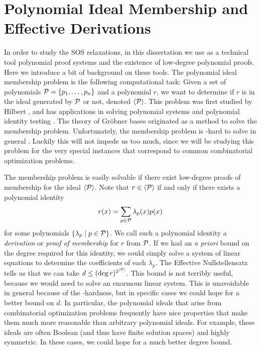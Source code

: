 \section{Polynomial Ideal Membership and Effective Derivations}

In order to study the SOS relaxations, in this dissertation we use as a technical tool polynomial proof systems and the existence of low-degree polynomial proofs.
Here we introduce a bit of background on these tools.
The polynomial ideal membership problem is the following computational task:
Given a set of polynomials $\mathcal P = \{p_1,\dots,p_n\}$ and a polynomial $r$, we want to determine if $r$ is in the ideal generated by $\mathcal P$ or not, denoted $\langle \mathcal P \rangle$.
This problem was first studied by Hilbert \cite{Hilbert1893}, and has applications in solving polynomial systems \cite{CLO07} and polynomial identity testing \cite{AM10}. 
The theory of Gr\"obner bases \cite{Buch65} originated as a method to solve the membership problem. 
Unfortunately, the membership problem is \expspace-hard to solve in general \cite{MM82,Huynh1985}.
Luckily this will not impede us too much, since we will be studying this problem for the very special instances that correspond to common combinatorial optimization problems.

The membership problem is easily solvable if there exist low-degree proofs of membership for the ideal $\langle \mathcal P \rangle$. 
Note that $r \in \langle \mathcal P \rangle$ if and only if there exists a polynomial identity
\[r(x) = \sum_{p \in \mathcal P} \lambda_p(x) p(x)\]
for some polynomials $\{\lambda_p \mid p \in \mathcal P\}$. We call such a polynomial identity a \emph{derivation} or \emph{proof of membership} for $r$ from $\mathcal P$.
If we had an \emph{a priori} bound on the degree required for this identity, we could simply solve a system of linear equations to determine the coefficients of each $\lambda_p$. The Effective Nullstellensatz \cite{Hermann1926} tells us that we can take $d \leq (\deg r)^{2^{|\mathcal P|}}$. This bound is not terribly useful, because we would need to solve an enormous linear system. This is unavoidable in general because of the \expspace-hardness, but in specific cases we could hope for a better bound on $d$. 
In particular, the polynomial ideals that arise from combinatorial optimization problems frequently have nice properties that make them much more reasonable than arbitrary polynomial ideals. For example, these ideals are often Boolean (and thus have finite solution spaces) and highly symmetric. In these cases, we could hope for a much better degree bound. 

